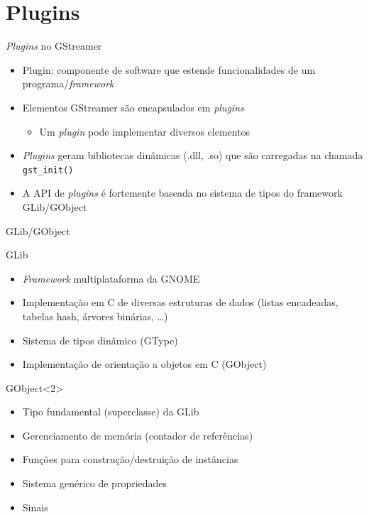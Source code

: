 \documentclass{beamer}
\let\C\lstinline
\def\en#1{\foreignlanguage{english}{\emph{#1}}}
\begin{document}
\section{Plugins}
\begin{frame}[c]{\en{Plugins} no GStreamer}
  \begin{itemize}
    \item Plugin: componente de software que estende funcionalidades de 
      um programa/\en{framework}
    \item Elementos GStreamer são encapsulados em \en{plugins} 
      \begin{itemize}
        \item Um \en{plugin} pode implementar diversos elementos
      \end{itemize}
    \item \en{Plugins} geram bibliotecas dinâmicas (.dll, .so) que são
      carregadas na chamada \C{gst_init()}
    \item A API de \en{plugins} é fortemente baseada no sistema de tipos
      do framework GLib/GObject
  \end{itemize}
\end{frame}

\begin{frame}[c]{GLib/GObject}
  \begin{block}{GLib}
    \begin{itemize}
      \item \en{Framework} multiplataforma da GNOME 
      \item Implementação em C de diversas estruturas de dados (listas 
        encadeadas, tabelas hash, árvores binárias, \ldots)
      \item Sistema de tipos dinâmico (GType) 
      \item Implementação de orientação a objetos em C (GObject)
    \end{itemize}
  \end{block}

  \begin{block}{GObject}<2>
    \begin{itemize}
      \item Tipo fundamental (superclasse) da GLib 
      \item Gerenciamento de memória (contador de referências)
      \item Funções para construção/destruição de instâncias 
      \item Sistema genérico de propriedades
      \item Sinais
    \end{itemize}
  \end{block}
\end{frame}
\end{document}
